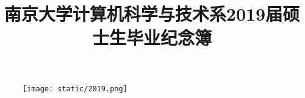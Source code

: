\documentclass[UTF8,12pt,a4paper,landscape, ctexart]{article}
\title{南京大学计算机科学与技术系2019届硕士生毕业纪念簿}
\begin{document}
\maketitle
\begin{figure}[h]
	\centering
	\texttt{[image: static/2019.png]}
\end{figure}
\newpage
\begin{multicols}{5}
  \begingroup
    \hypersetup{hidelinks}
    \tableofcontents
  \endgroup
\end{multicols}
\newpage
\end{document}
